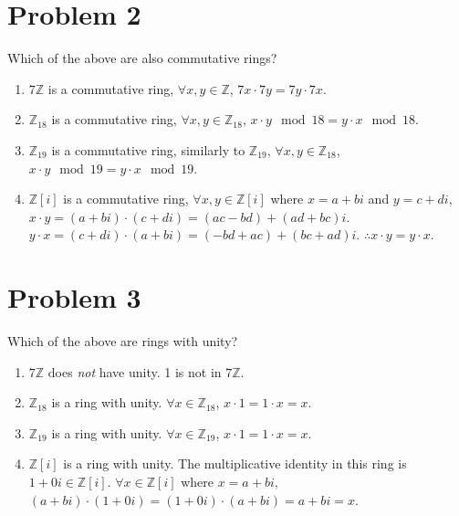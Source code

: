 \documentclass[12pt]{article}
\newcommand{\Z}{\mathbb{Z}}
\begin{document}
\section{Problem 2}
Which of the above are also commutative rings?
\begin{enumerate}
    \item $7\Z$ is a commutative ring, $\forall x,y\in\Z$, $7x\cdot7y=7y\cdot7x$.
    \item $\Z_{18}$ is a commutative ring, $\forall x,y\in\Z_{18}$, $x\cdot y\mod{18}=y\cdot x\mod{18}$.
    \item $\Z_{19}$ is a commutative ring, similarly to $\Z_{19}$, $\forall x,y\in\Z_{18}$, $x\cdot y\mod{19}=y\cdot x\mod{19}$.
    \item $\Z[i]$ is a commutative ring, $\forall x,y\in\Z[i]$ where $x=a+bi$ and $y=c+di$, $x\cdot y=(a+bi)\cdot(c+di)=(ac-bd)+(ad+bc)i$. $y\cdot x=(c+di)\cdot(a+bi)=(-bd+ac)+(bc+ad)i$. $\therefore x\cdot y=y\cdot x$.
\end{enumerate}
\section{Problem 3}
Which of the above are rings with unity?
\begin{enumerate}
    \item $7\Z$ does \emph{not} have unity. 1 is not in $7\Z$.
    \item $\Z_{18}$ is a ring with unity. $\forall x\in\Z_{18}$, $x\cdot1=1\cdot x=x$.
    \item $\Z_{19}$ is a ring with unity. $\forall x\in\Z_{19}$, $x\cdot1=1\cdot x=x$.
    \item $\Z[i]$ is a ring with unity. The multiplicative identity in this ring is $1+0i\in\Z[i]$. $\forall x\in\Z[i]$ where $x=a+bi$, $(a+bi)\cdot(1+0i)=(1+0i)\cdot(a+bi)=a+bi=x$.
\end{enumerate}
\end{document}
